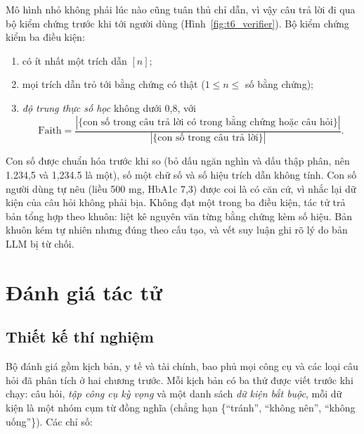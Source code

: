 
Mô hình nhỏ không phải lúc nào cũng tuân thủ chỉ dẫn, vì vậy câu trả lời đi qua bộ kiểm chứng trước khi tới người
dùng (Hình~\ref{fig:t6_verifier}). Bộ kiểm chứng kiểm ba điều kiện:

\begin{enumerate}
  \item có ít nhất một trích dẫn $[n]$;
  \item mọi trích dẫn trỏ tới bằng chứng có thật ($1 \le n \le$ số bằng chứng);
  \item \emph{độ trung thực số học} không dưới 0,8, với
        \begin{equation}\label{eq:faith}
          \mathrm{Faith} = \frac{\left|\{\text{con số trong câu trả lời có trong bằng chứng hoặc câu hỏi}\}\right|}
                                {\left|\{\text{con số trong câu trả lời}\}\right|}.
        \end{equation}
\end{enumerate}

Con số được chuẩn hóa trước khi so (bỏ dấu ngăn nghìn và dấu thập phân, nên 1.234,5 và 1,234.5 là một), số một
chữ số và số hiệu trích dẫn không tính. Con số người dùng tự nêu (liều 500 mg, HbA1c 7,3) được coi là có căn cứ, vì
nhắc lại dữ kiện của câu hỏi không phải bịa. Không đạt một trong ba điều kiện, tác tử trả bản tổng hợp theo khuôn:
liệt kê nguyên văn từng bằng chứng kèm số hiệu. Bản khuôn kém tự nhiên nhưng đúng theo cấu tạo, và vết suy luận ghi
rõ lý do bản LLM bị từ chối.




\section{Đánh giá tác tử}\label{sec:agent-ketqua}
\subsection{Thiết kế thí nghiệm}
Bộ đánh giá gồm  kịch bản,  y tế và  tài chính, bao
phủ mọi công cụ và các loại câu hỏi đã phân tích ở hai chương trước. Mỗi kịch bản có ba thứ được viết trước khi chạy:
câu hỏi, \emph{tập công cụ kỳ vọng} và một danh sách \emph{dữ kiện bắt buộc}, mỗi dữ kiện là một nhóm cụm từ đồng
nghĩa (chẳng hạn \{``tránh'', ``không nên'', ``không uống''\}). Các chỉ số:

